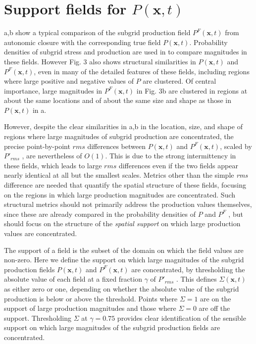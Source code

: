 \section{Support fields for $P(\mathbf{x},t)$} 
\label{sec:IIIC}

a,b show a typical comparison of the subgrid production field $P^{F}(\mathbf{x},t)$ from autonomic closure with the corresponding true field $P(\mathbf{x},t)$. Probability densities of subgrid stress and production are used in  to compare magnitudes in these fields. However Fig. 3 also shows structural similarities in  $P(\mathbf{x},t)$ and $P^{F}(\mathbf{x},t)$, even in many of the detailed features of these fields, including regions where large positive and negative values of $P$ are clustered. Of central importance, large magnitudes in $P^{F}(\mathbf{x},t)$  in Fig. 3b are clustered in regions at about the same locations and of about the same size and shape as those in $P(\mathbf{x},t)$ in a. 

However, despite the clear similarities in a,b in the location, size, and shape of regions where large magnitudes of subgrid production are concentrated, the precise point-by-point $rms$ differences between  $P(\mathbf{x},t)$ and $P^F(\mathbf{x},t)$, scaled by $P'_{rms}$ , are nevertheless of $O(1)$. This is due to the strong intermittency in these fields, which leads to large $rms$ differences even if the two fields appear nearly identical at all but the smallest scales. Metrics other than the simple \textit{rms} difference are needed that quantify the spatial structure of these fields, focusing on the regions in which large production magnitudes are concentrated. Such structural metrics should not primarily address the production values themselves, since these are already compared in the probability densities of $P$ and $P^F$  , but should focus on the structure of the \textit{spatial support} on which large production values are concentrated.  

The support of a field is the subset of the domain on which the field values are non-zero. Here we define the support on which large magnitudes of the subgrid production fields  $P(\mathbf{x},t)$ and $P^F(\mathbf{x},t)$ are concentrated, by thresholding the absolute value of each field at a fixed fraction  $\gamma$ of $P'_{rms}$ . This defines $\Sigma(\mathbf{x},t)$  as either zero or one, depending on whether the absolute value of the subgrid production is below or above the threshold. Points where  $\Sigma = 1$ are on the support of large production magnitudes and those where  $\Sigma = 0$  are off the support. Thresholding $\Sigma$  at $\gamma = 0.75$   provides clear identification of the sensible support on which large magnitudes of the subgrid production fields are concentrated. 

